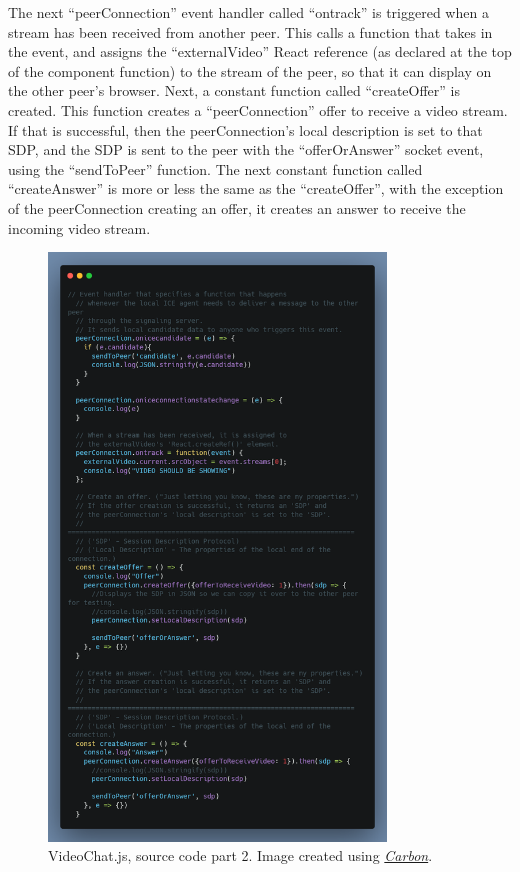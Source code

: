 The next “peerConnection” event handler called “ontrack” is triggered when a stream has been received from another peer. This calls a function that takes in the event, and assigns the “externalVideo” React reference (as declared at the top of the component function) to the stream of the peer, so that it can display on the other peer’s browser.
Next, a constant function called “createOffer” is created. This function creates a “peerConnection” offer to receive a video stream. If that is successful, then the peerConnection’s local description is set to that SDP, and the SDP is sent to the peer with the “offerOrAnswer” socket event, using the “sendToPeer” function. The next constant function called “createAnswer” is more or less the same as the “createOffer”, with the exception of the peerConnection creating an offer, it creates an answer to receive the incoming video stream. 
\begin{figure}[H]
    \centering
    \includegraphics[width=0.8\textwidth]{img/SystemDesign/videoChatJs_2.png}
    \caption{VideoChat.js, source code part 2. Image created using \href{https://carbon.now.sh/}{\textit{Carbon}}.}
\end{figure}

